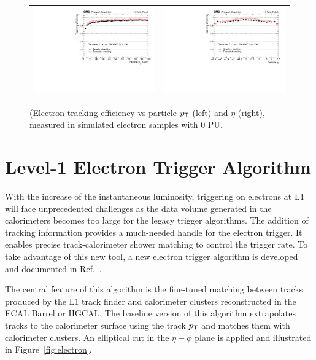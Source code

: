  \begin{figure}[tbh!]
 \begin{center}
 \begin{tabular}{cc}
  \includegraphics[width=.45\linewidth]{figures/Part2/Upgrade/L1TK_elec-pu0_eff_pt}&
  \includegraphics[width=.45\linewidth]{figures/Part2/Upgrade/L1TK_elec-pu0_eff_eta}
 \end{tabular}
 \caption{(Electron tracking efficiency vs particle $p_{\textsf{T}}$ (left) and $\eta$ (right), measured in simulated electron samples with 0 \ac{PU}.}
 \label{fig:electronperformance}
 \end{center}
\end{figure} 

\section{Level-1 Electron Trigger Algorithm}
\label{sec:L1Ele}

With the increase of the instantaneous luminosity, triggering on electrons at \ac{L1} will face unprecedented challenges as the data volume generated in the calorimeters becomes too large for the legacy trigger algorithms. The addition of tracking information provides a much-needed handle for the electron trigger. It enables precise track-calorimeter shower matching to control the trigger rate. To take advantage of this new tool, a new electron trigger algorithm is developed and documented in Ref.~\cite{Zabi:2020gjd}. 

The central feature of this algorithm is the fine-tuned matching between tracks produced by the \ac{L1} track finder and calorimeter clusters reconstructed in the \ac{ECAL} Barrel or \ac{HGCAL}. The baseline version of this algorithm extrapolates tracks to the calorimeter surface using the track $p_{\textsf{T}}$ and matches them with calorimeter clusters. An elliptical cut in the $\eta-\phi$ plane is applied and illustrated in Figure~\ref{fig:electron}.
  

